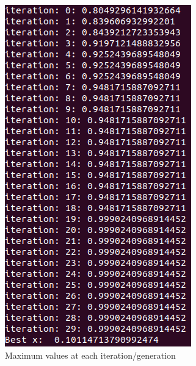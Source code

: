 \documentclass[12pt]{article}
\begin{document}
\newpage
\begin{figure}[H]
\centering
\begin{minipage}{.45\textwidth}
  \centering
  \includegraphics[width=.95\linewidth]{images/p1_iterations_hc}
  \caption{Maximum values at each iteration/generation}
  \label{fig:p1_iter}
\end{minipage}\hfill
\begin{minipage}{.45\textwidth}
  \centering

\end{minipage}
\end{figure}
\end{document}
